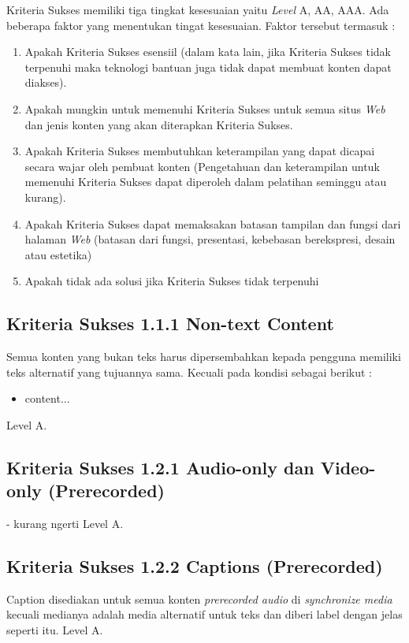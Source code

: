 Kriteria Sukses memiliki tiga tingkat kesesuaian yaitu \textit{Level} A, AA, AAA. Ada beberapa faktor yang menentukan tingat kesesuaian. Faktor tersebut termasuk :
\begin{enumerate}
	\item Apakah Kriteria Sukses esensiil (dalam kata lain, jika Kriteria Sukses tidak terpenuhi maka teknologi bantuan juga tidak dapat membuat konten dapat diakses).
	\item Apakah mungkin untuk memenuhi Kriteria Sukses untuk semua situs \textit{Web} dan jenis konten yang akan diterapkan Kriteria Sukses.
	\item Apakah Kriteria Sukses membutuhkan keterampilan yang dapat dicapai secara wajar oleh pembuat konten (Pengetahuan dan keterampilan untuk memenuhi Kriteria Sukses dapat diperoleh dalam pelatihan seminggu atau kurang).
	\item Apakah Kriteria Sukses dapat memaksakan batasan tampilan dan fungsi dari halaman \textit{Web} (batasan dari fungsi, presentasi, kebebasan berekspresi, desain atau estetika)
	\item Apakah tidak ada solusi jika Kriteria Sukses tidak terpenuhi
\end{enumerate}

\subsection{Kriteria Sukses 1.1.1 Non-text Content}
\label{sec:kriteria_1.1.1}
Semua konten yang bukan teks harus dipersembahkan kepada pengguna memiliki teks alternatif yang tujuannya sama. Kecuali pada kondisi sebagai berikut :
\begin{itemize}
	\item content...
\end{itemize} 
Level A.

\subsection{Kriteria Sukses 1.2.1 Audio-only dan Video-only (Prerecorded)}
\label{sec:kriteria_1.2.1}
- kurang ngerti
Level A.

\subsection{Kriteria Sukses 1.2.2 Captions (Prerecorded)}
\label{sec:kriteria_1.2.2}
Caption disediakan untuk semua konten \textit{prerecorded audio} di \textit{synchronize media} kecuali medianya adalah media alternatif untuk teks dan diberi label dengan jelas seperti itu.
Level A.

